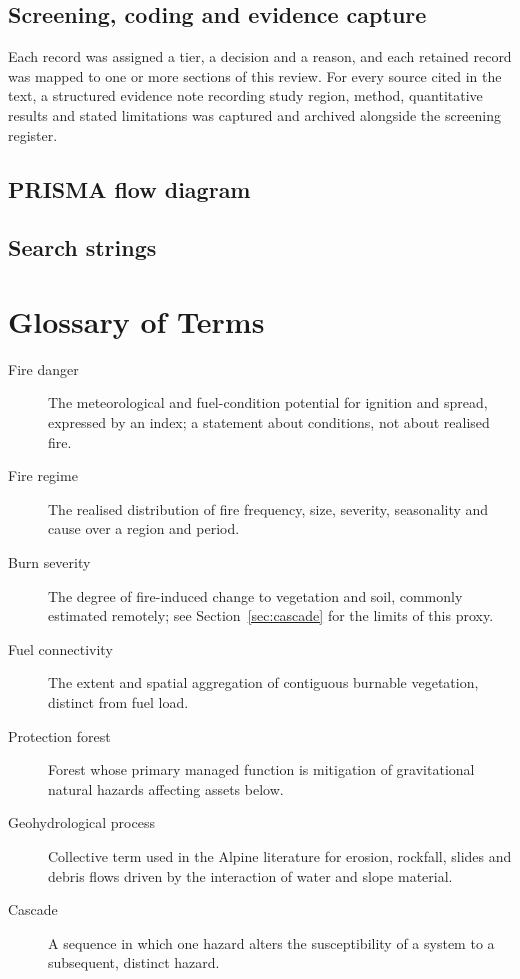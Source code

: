 \documentclass[11pt,a4paper]{article}
\begin{document}
\subsection{Screening, coding and evidence capture}

Each record was assigned a tier, a decision and a reason, and each retained record was mapped to one or more sections of this review. For every source cited in the text, a structured evidence note recording study region, method, quantitative results and stated limitations was captured and archived alongside the screening register.

\subsection{PRISMA flow diagram}

\subsection{Search strings}


\section{Glossary of Terms}

\begin{description}
    \item[Fire danger] The meteorological and fuel-condition potential for ignition and spread, expressed by an index; a statement about conditions, not about realised fire.
    \item[Fire regime] The realised distribution of fire frequency, size, severity, seasonality and cause over a region and period.
    \item[Burn severity] The degree of fire-induced change to vegetation and soil, commonly estimated remotely; see Section~\ref{sec:cascade} for the limits of this proxy.
    \item[Fuel connectivity] The extent and spatial aggregation of contiguous burnable vegetation, distinct from fuel load.
    \item[Protection forest] Forest whose primary managed function is mitigation of gravitational natural hazards affecting assets below.
    \item[Geohydrological process] Collective term used in the Alpine literature for erosion, rockfall, slides and debris flows driven by the interaction of water and slope material.
    \item[Cascade] A sequence in which one hazard alters the susceptibility of a system to a subsequent, distinct hazard.
\end{description}




\end{document}
